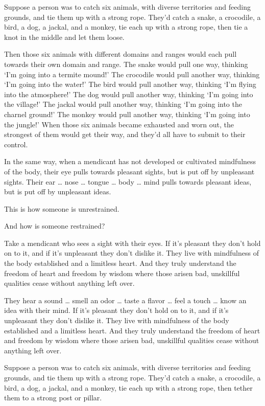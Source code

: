 \documentclass[12pt,openany]{book}%
\begin{document}
Suppose a person was to catch six animals, with diverse territories and feeding grounds, and tie them up with a strong rope. They’d catch a snake, a crocodile, a bird, a dog, a jackal, and a monkey, tie each up with a strong rope, then tie a knot in the middle and let them loose. 

Then those six animals with different domains and ranges would each pull towards their own domain and range. The snake would pull one way, thinking ‘I’m going into a termite mound!’ The crocodile would pull another way, thinking ‘I’m going into the water!’ The bird would pull another way, thinking ‘I’m flying into the atmosphere!’ The dog would pull another way, thinking ‘I’m going into the village!’ The jackal would pull another way, thinking ‘I’m going into the charnel ground!’ The monkey would pull another way, thinking ‘I’m going into the jungle!’ When those six animals became exhausted and worn out, the strongest of them would get their way, and they’d all have to submit to their control. 

In the same way, when a mendicant has not developed or cultivated mindfulness of the body, their eye pulls towards pleasant sights, but is put off by unpleasant sights. Their ear … nose … tongue … body … mind pulls towards pleasant ideas, but is put off by unpleasant ideas. 

This is how someone is unrestrained. 

And how is someone restrained? 

Take a mendicant who sees a sight with their eyes. If it’s pleasant they don’t hold on to it, and if it’s unpleasant they don’t dislike it. They live with mindfulness of the body established and a limitless heart. And they truly understand the freedom of heart and freedom by wisdom where those arisen bad, unskillful qualities cease without anything left over. 

They hear a sound … smell an odor … taste a flavor … feel a touch … know an idea with their mind. If it’s pleasant they don’t hold on to it, and if it’s unpleasant they don’t dislike it. They live with mindfulness of the body established and a limitless heart. And they truly understand the freedom of heart and freedom by wisdom where those arisen bad, unskillful qualities cease without anything left over. 

Suppose a person was to catch six animals, with diverse territories and feeding grounds, and tie them up with a strong rope. They’d catch a snake, a crocodile, a bird, a dog, a jackal, and a monkey, tie each up with a strong rope, then tether them to a strong post or pillar. 
\end{document}
